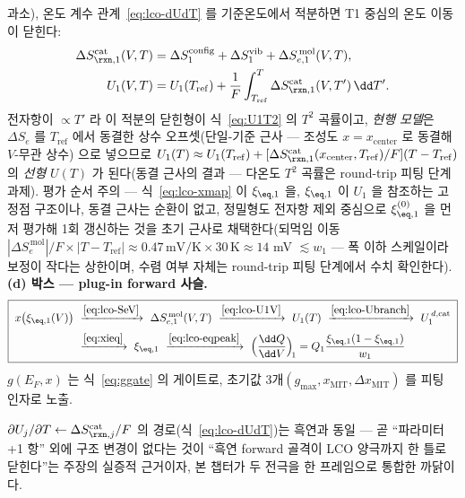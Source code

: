 \begin{enumerate}[label=(\roman*),leftmargin=2.2em,itemsep=1pt]
과소), 온도 계수 관계~\eqref{eq:lco-dUdT} 를 기준온도에서 적분하면 T1 중심의 온도 이동이 닫힌다:
\begin{equation}
\begin{aligned}
\Delta S_{\rxn,1}^\mathrm{cat}(V,T)&=\Delta S_1^\mathrm{config}+\Delta S_1^\mathrm{vib}
+\Delta S_{e,1}^{\,\mathrm{mol}}(V,T),\\
U_1(V,T)&=U_1(T_\mathrm{ref})+\frac1F\int_{T_\mathrm{ref}}^{T}\Delta S_{\rxn,1}^\mathrm{cat}(V,T')\,\dd T'.
\end{aligned}
\label{eq:lco-U1V}
\end{equation}
전자항이 $\propto T'$ 라 이 적분의 닫힌형이 식~\eqref{eq:U1T2} 의 $T^2$ 곡률이고, \emph{현행 모델}은
$\Delta S_e$ 를 $T_\mathrm{ref}$ 에서 동결한 상수 오프셋(단일-기준 근사 --- 조성도 $x{=}x_\mathrm{center}$ 로
동결해 $V$-무관 상수)
으로 넣으므로 $U_1(T)\approx U_1(T_\mathrm{ref})+[\Delta S_{\rxn,1}^\mathrm{cat}(x_\mathrm{center},T_\mathrm{ref})/F]
(T-T_\mathrm{ref})$ 의 \emph{선형} $U(T)$ 가 된다(동결 근사의 결과 --- 다온도 $T^2$ 곡률은 round-trip 피팅 단계 과제). 평가 순서 주의 --- 식~\eqref{eq:lco-xmap} 이
$\xi_{\eq,1}$ 을, $\xi_{\eq,1}$ 이 $U_1$ 을 참조하는 고정점 구조이나, 동결 근사는 순환이 없고, 정밀형도
전자항 제외 중심으로 $\xi_{\eq,1}^{(0)}$ 을 먼저 평가해 1회 갱신하는 것을 초기 근사로 채택한다(되먹임
이동 $|\Delta S_e^{\,\mathrm{mol}}|/F\times|T-T_\mathrm{ref}|\approx0.47\,\mathrm{mV/K}\times30\,\mathrm K
\approx14$ mV $\lesssim w_1$ --- 폭 이하 스케일이라 보정이 작다는 상한이며, 수렴 여부 자체는 round-trip
피팅 단계에서 수치 확인한다). \textbf{(d) 박스 --- plug-in forward 사슬.}
\begin{equation}
\boxed{\;\begin{aligned}
x\big(\xi_{\eq,1}(V)\big)\ &\xrightarrow{\eqref{eq:lco-SeV}}\ \Delta S_{e,1}^{\,\mathrm{mol}}(V,T)
\ \xrightarrow{\eqref{eq:lco-U1V}}\ U_1(T)\ \xrightarrow{\eqref{eq:lco-Ubranch}}\ U_1^{\,d,\mathrm{cat}}\\[2pt]
&\xrightarrow{\eqref{eq:xieq}}\ \xi_{\eq,1}\ \xrightarrow{\eqref{eq:lco-eqpeak}}\
\Big(\frac{\dd Q}{\dd V}\Big)_{\!1}=Q_1\frac{\xi_{\eq,1}(1-\xi_{\eq,1})}{w_1}
\end{aligned}\;}
\label{eq:lco-plugin}
\end{equation}
$g(E_F,x)$ 는 식~\eqref{eq:ggate} 의 게이트로, 초기값 3개$(g_{\max},x_\mathrm{MIT},\Delta x_\mathrm{MIT})$
를 피팅 인자로 노출.
\end{enumerate}
$\partial U_j/\partial T\leftarrow\Delta S_{\rxn,j}^\mathrm{cat}/F$ 의 경로(식~\eqref{eq:lco-dUdT})는 흑연과 동일 ---
곧 ``파라미터 +1 항'' 외에 구조 변경이 없다는 것이 ``흑연 forward 골격이 LCO 양극까지 한 틀로 닫힌다''는
주장의 실증적 근거이자, 본 챕터가 두 전극을 한 프레임으로 통합한 까닭이다.

